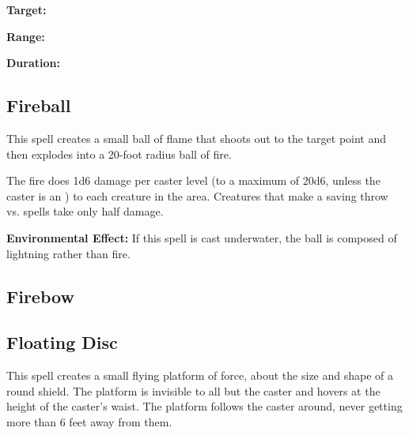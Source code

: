 \begin{multicols*}{2}
{\textbf{Target:}

\textbf{Range:}

\textbf{Duration:} }



\subsection{Fireball}\label{spell:Fireball}

This spell creates a small ball of flame that shoots out to the target point and then explodes into a 20-foot radius ball of fire.

The fire does 1d6 damage per caster level (to a maximum of 20d6, unless the caster is an ) to each creature in the area. Creatures that make a saving throw vs. spells take only half damage.

\textbf{Environmental Effect:} If this spell is cast underwater, the ball is composed of lightning rather than fire.


\subsection{Firebow}\label{spell:Firebow}



\subsection{Floating Disc}\label{spell:Floating Disc}

This spell creates a small flying platform of force, about the size and shape of a round shield. The platform is invisible to all but the caster and hovers at the height of the caster’s waist. The platform follows the caster around, never getting more than 6 feet away from them.


\end{multicols*}
